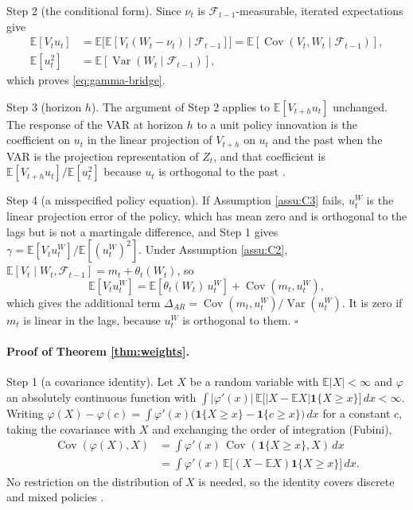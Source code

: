 \documentclass[12pt,a4paper]{article}
\theoremstyle{definition}
\newcommand{\E}{\mathbb{E}}
\newcommand{\cov}{\operatorname{Cov}}
\newcommand{\var}{\operatorname{Var}}
\begin{document}
Step 2 (the conditional form). Since $\nu_t$ is $\mathcal{F}_{t-1}$-measurable, iterated expectations give
\[
\begin{aligned}
\E[V_tu_t]&=\E\big[\E[V_t(W_t-\nu_t)\mid\mathcal{F}_{t-1}]\big]=\E[\cov(V_t,W_t\mid\mathcal{F}_{t-1})],\\
\E[u_t^2]&=\E[\var(W_t\mid\mathcal{F}_{t-1})],
\end{aligned}
\]
which proves \eqref{eq:gamma-bridge}.

Step 3 (horizon $h$). The argument of Step 2 applies to $\E[V_{t+h}u_t]$ unchanged. The response of the VAR at horizon $h$ to a unit policy innovation is the coefficient on $u_t$ in the linear projection of $V_{t+h}$ on $u_t$ and the past when the VAR is the projection representation of $Z_t$, and that coefficient is $\E[V_{t+h}u_t]/\E[u_t^2]$ because $u_t$ is orthogonal to the past \citep{PlagborgMollerWolf2021}.

Step 4 (a misspecified policy equation). If Assumption \ref{assu:C3} fails, $u_t^W$ is the linear projection error of the policy, which has mean zero and is orthogonal to the lags but is not a martingale difference, and Step 1 gives $\gamma=\E[V_tu_t^W]/\E[(u_t^W)^2]$. Under Assumption \ref{assu:C2}, $\E[V_t\mid W_t,\mathcal{F}_{t-1}]=m_t+\theta_t(W_t)$, so
\[
\E[V_tu_t^W]=\E[\theta_t(W_t)\,u_t^W]+\cov(m_t,u_t^W),
\]
which gives the additional term $\Delta_{AR}=\cov(m_t,u_t^W)/\var(u_t^W)$. It is zero if $m_t$ is linear in the lags, because $u_t^W$ is orthogonal to them. $\square$

\paragraph{Proof of Theorem \ref{thm:weights}.} Step 1 (a covariance identity). Let $X$ be a random variable with $\E|X|<\infty$ and $\varphi$ an absolutely continuous function with $\int|\varphi'(x)|\,\E\big[|X-\E X|\mathbf{1}\{X\geq x\}\big]\,dx<\infty$. Writing $\varphi(X)-\varphi(c)=\int\varphi'(x)\big(\mathbf{1}\{X\geq x\}-\mathbf{1}\{c\geq x\}\big)\,dx$ for a constant $c$, taking the covariance with $X$ and exchanging the order of integration (Fubini),
\[
\begin{aligned}
\cov(\varphi(X),X)&=\int\varphi'(x)\,\cov(\mathbf{1}\{X\geq x\},X)\,dx\\
&=\int\varphi'(x)\,\E\big[(X-\E X)\mathbf{1}\{X\geq x\}\big]\,dx .
\end{aligned}
\]
No restriction on the distribution of $X$ is needed, so the identity covers discrete and mixed policies \citep{Yitazaki1996}.
\end{document}
